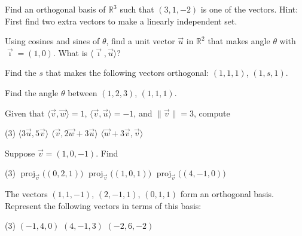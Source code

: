 \begin{exercise}
Find an orthogonal basis of ${\mathbb{R}}^3$ such that $(3,1,-2)$
is one of the vectors.  Hint: First find two extra vectors to make a
linearly independent set.
\end{exercise}

\begin{exercise}
Using cosines and sines of $\theta$, find a unit vector $\vec{u}$
in ${\mathbb{R}}^2$ that
makes angle $\theta$ with $\vec{\imath} = (1,0)$.  What is
$\langle \vec{\imath} , \vec{u} \rangle$?
\end{exercise}

\setcounter{exercise}{100}

\begin{exercise}
Find the $s$ that makes the following vectors orthogonal:
$(1,1,1)$, $(1,s,1)$.
\end{exercise}

\begin{exercise}
Find the angle $\theta$ between
$(1,2,3)$, $(1,1,1)$.
\end{exercise}

\begin{exercise}
Given that $\langle \vec{v} , \vec{w} \rangle = 1$,
$\langle \vec{v} , \vec{u} \rangle = -1$, and
$\lVert \vec{v} \rVert = 3$, compute
\begin{tasks}(3)
\task $\langle 3 \vec{u} , 5 \vec{v} \rangle$
\task $\langle \vec{v} , 2 \vec{w} + 3 \vec{u} \rangle$
\task $\langle \vec{w} + 3 \vec{v}, \vec{v} \rangle$
\end{tasks}
\end{exercise}

\begin{exercise}
Suppose $\vec{v} = (1,0,-1)$.  Find
\begin{tasks}(3)
\task $\operatorname{proj}_{\vec{v}}\bigl( (0,2,1) \bigr)$
\task $\operatorname{proj}_{\vec{v}}\bigl( (1,0,1) \bigr)$
\task $\operatorname{proj}_{\vec{v}}\bigl( (4,-1,0) \bigr)$
\end{tasks}
\end{exercise}

\begin{exercise}
The vectors $(1,1,-1)$, $(2,-1,1)$, $(0,1,1)$ form an orthogonal basis.
Represent the following vectors in terms of this basis:
\begin{tasks}(3)
\task $(-1,4,0)$
\task $(4,-1,3)$
\task $(-2,6,-2)$
\end{tasks}
\end{exercise}


